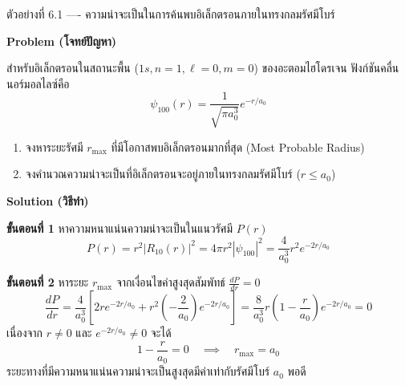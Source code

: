 \begin{psctbox}{ตัวอย่างที่ 6.1 ---- ความน่าจะเป็นในการค้นพบอิเล็กตรอนภายในทรงกลมรัศมีโบร์}

\textbf{Problem (โจทย์ปัญหา)}

สำหรับอิเล็กตรอนในสถานะพื้น ($1s, n=1, \ell=0, m=0$) ของอะตอมไฮโดรเจน ฟังก์ชันคลื่นนอร์มอลไลซ์คือ
\begin{equation*}
\psi_{100}(r) = \frac{1}{\sqrt{\pi a_0^3}} e^{-r/a_0}
\end{equation*}
\begin{enumerate}
    \item จงหาระยะรัศมี $r_{\text{max}}$ ที่มีโอกาสพบอิเล็กตรอนมากที่สุด (Most Probable Radius)
    \item จงคำนวณความน่าจะเป็นที่อิเล็กตรอนจะอยู่ภายในทรงกลมรัศมีโบร์ ($r \le a_0$)
\end{enumerate}

\textbf{Solution (วิธีทำ)}

\textbf{ขั้นตอนที่ 1} หาความหนาแน่นความน่าจะเป็นในแนวรัศมี $P(r)$
\begin{equation*}
P(r) = r^2 |R_{10}(r)|^2 = 4\pi r^2 |\psi_{100}|^2 = \frac{4}{a_0^3} r^2 e^{-2r/a_0}
\end{equation*}

\textbf{ขั้นตอนที่ 2} หาระยะ $r_{\text{max}}$ จากเงื่อนไขค่าสูงสุดสัมพัทธ์ $\frac{dP}{dr} = 0$
\begin{equation*}
\frac{dP}{dr} = \frac{4}{a_0^3} \left[ 2r e^{-2r/a_0} + r^2 \left(-\frac{2}{a_0}\right) e^{-2r/a_0} \right] = \frac{8}{a_0^3} r \left( 1 - \frac{r}{a_0} \right) e^{-2r/a_0} = 0
\end{equation*}
เนื่องจาก $r \neq 0$ และ $e^{-2r/a_0} \neq 0$ จะได้
\begin{equation*}
1 - \frac{r}{a_0} = 0 \quad \implies \quad r_{\text{max}} = a_0
\end{equation*}
ระยะทางที่มีความหนาแน่นความน่าจะเป็นสูงสุดมีค่าเท่ากับรัศมีโบร์ $a_0$ พอดี


\end{psctbox}
